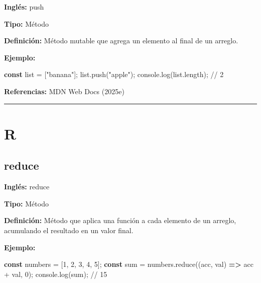 \documentclass[
  letterpaper,
  DIV=11,
  numbers=noendperiod]{scrreprt}
\newenvironment{Shaded}{\begin{snugshade}}{\end{snugshade}}
\newcommand{\AttributeTok}[1]{\textcolor[rgb]{0.40,0.45,0.13}{#1}}
\newcommand{\BuiltInTok}[1]{\textcolor[rgb]{0.00,0.23,0.31}{#1}}
\newcommand{\CommentTok}[1]{\textcolor[rgb]{0.37,0.37,0.37}{#1}}
\newcommand{\DecValTok}[1]{\textcolor[rgb]{0.68,0.00,0.00}{#1}}
\newcommand{\FunctionTok}[1]{\textcolor[rgb]{0.28,0.35,0.67}{#1}}
\newcommand{\KeywordTok}[1]{\textcolor[rgb]{0.00,0.23,0.31}{\textbf{#1}}}
\newcommand{\NormalTok}[1]{\textcolor[rgb]{0.00,0.23,0.31}{#1}}
\newcommand{\OperatorTok}[1]{\textcolor[rgb]{0.37,0.37,0.37}{#1}}
\newcommand{\StringTok}[1]{\textcolor[rgb]{0.13,0.47,0.30}{#1}}
\let\oldsubsection\subsection
\renewcommand{\subsection}{\phantomsection\oldsubsection}
\begin{document}
\textbf{Inglés:} push

\textbf{Tipo:} Método

\textbf{Definición:} Método mutable que agrega un elemento al final de
un arreglo.

\textbf{Ejemplo:}

\begin{Shaded}
\begin{Highlighting}[]
\KeywordTok{const}\NormalTok{ list }\OperatorTok{=}\NormalTok{ [}\StringTok{"banana"}\NormalTok{]}\OperatorTok{;}
\NormalTok{list}\OperatorTok{.}\FunctionTok{push}\NormalTok{(}\StringTok{"apple"}\NormalTok{)}\OperatorTok{;}
\BuiltInTok{console}\OperatorTok{.}\FunctionTok{log}\NormalTok{(list}\OperatorTok{.}\AttributeTok{length}\NormalTok{)}\OperatorTok{;} \CommentTok{// 2}
\end{Highlighting}
\end{Shaded}

\textbf{Referencias:} MDN Web Docs (2025e)

\begin{center}\rule{0.5\linewidth}{0.5pt}\end{center}

\section*{R}\label{r}


\subsection*{reduce}\label{glos-reduce}

\textbf{Inglés:} reduce

\textbf{Tipo:} Método

\textbf{Definición:} Método que aplica una función a cada elemento de un
arreglo, acumulando el resultado en un valor final.

\textbf{Ejemplo:}

\begin{Shaded}
\begin{Highlighting}[]
\KeywordTok{const}\NormalTok{ numbers }\OperatorTok{=}\NormalTok{ [}\DecValTok{1}\OperatorTok{,} \DecValTok{2}\OperatorTok{,} \DecValTok{3}\OperatorTok{,} \DecValTok{4}\OperatorTok{,} \DecValTok{5}\NormalTok{]}\OperatorTok{;}
\KeywordTok{const}\NormalTok{ sum }\OperatorTok{=}\NormalTok{ numbers}\OperatorTok{.}\FunctionTok{reduce}\NormalTok{((acc}\OperatorTok{,}\NormalTok{ val) }\KeywordTok{=\textgreater{}}\NormalTok{ acc }\OperatorTok{+}\NormalTok{ val}\OperatorTok{,} \DecValTok{0}\NormalTok{)}\OperatorTok{;}
\BuiltInTok{console}\OperatorTok{.}\FunctionTok{log}\NormalTok{(sum)}\OperatorTok{;} \CommentTok{// 15}
\end{Highlighting}
\end{Shaded}
\end{document}
